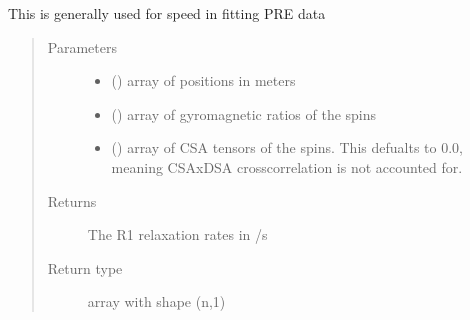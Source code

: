 \documentclass[a4paper,10pt,english,openany,oneside]{sphinxmanual}
\begin{document}
\begin{fulllineitems}
\begin{fulllineitems}
\begin{fulllineitems}
This is generally used for speed in fitting PRE data
\begin{quote}\begin{description}
\item[{Parameters}] \leavevmode\begin{itemize}
\item {} 
 (\sphinxstyleliteralemphasis{\sphinxupquote{ (}}\sphinxstyleliteralemphasis{\sphinxupquote{,}}\sphinxstyleliteralemphasis{\sphinxupquote{)}}) \textendash{} array of positions in meters

\item {} 
 (\sphinxstyleliteralemphasis{\sphinxupquote{ (}}\sphinxstyleliteralemphasis{\sphinxupquote{,}}\sphinxstyleliteralemphasis{\sphinxupquote{)}}) \textendash{} array of gyromagnetic ratios of the spins

\item {} 
 (\sphinxstyleliteralemphasis{\sphinxupquote{ (}}\sphinxstyleliteralemphasis{\sphinxupquote{,}}\sphinxstyleliteralemphasis{\sphinxupquote{,}}\sphinxstyleliteralemphasis{\sphinxupquote{) }}\sphinxstyleliteralemphasis{\sphinxupquote{(}}\sphinxstyleliteralemphasis{\sphinxupquote{)}}) \textendash{} array of CSA tensors of the spins.
This defualts to 0.0, meaning CSAxDSA crosscorrelation is
not accounted for.

\end{itemize}

\item[{Returns}] \leavevmode
{} \textendash{} The R1 relaxation rates in /s

\item[{Return type}] \leavevmode
array with shape (n,1)

\end{description}\end{quote}


\end{fulllineitems}
\end{fulllineitems}
\end{fulllineitems}
\end{document}
